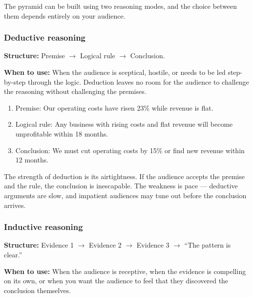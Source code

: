 
The pyramid can be built using two reasoning modes, and the choice between them depends entirely on your audience.

\subsubsection{Deductive reasoning}

\textbf{Structure:} Premise $\to$ Logical rule $\to$ Conclusion.

\textbf{When to use:} When the audience is sceptical, hostile, or needs to be led step-by-step through the logic. Deduction leaves no room for the audience to challenge the reasoning without challenging the premises.

\begin{keybox}
\begin{enumerate}[leftmargin=1.5em]
  \item Premise: Our operating costs have risen 23\% while revenue is flat.
  \item Logical rule: Any business with rising costs and flat revenue will become unprofitable within 18 months.
  \item Conclusion: We must cut operating costs by 15\% or find new revenue within 12 months.
\end{enumerate}
\end{keybox}

The strength of deduction is its airtightness. If the audience accepts the premise and the rule, the conclusion is inescapable. The weakness is pace --- deductive arguments are slow, and impatient audiences may tune out before the conclusion arrives.

\subsubsection{Inductive reasoning}

\textbf{Structure:} Evidence 1 $\to$ Evidence 2 $\to$ Evidence 3 $\to$ ``The pattern is clear.''

\textbf{When to use:} When the audience is receptive, when the evidence is compelling on its own, or when you want the audience to feel that they discovered the conclusion themselves.

